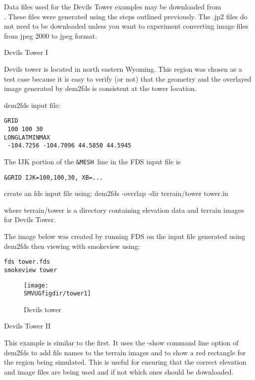 
Data files used for the Devils Tower examples may be downloaded from \\
.
These files were generated using the steps outlined previously.
The .jp2 files do not need to be downloaded unless you want to experiment converting image files from jpeg 2000 to jpeg format.

Devils Tower I

Devils tower is located in north eastern Wyoming.
This region was chosen as a test case because it is easy to verify (or not) that the geometry and the
overlayed image generated by dem2fds is consistent at the tower location.

dem2fds input file:
\begin{verbatim}
GRID
 100 100 30
LONGLATMINMAX
 -104.7256 -104.7096 44.5850 44.5945
\end{verbatim}

The IJK portion of the {\tt \&MESH}\ line in the FDS input file is

\begin{verbatim}
&GRID IJK=100,100,30, XB=...
\end{verbatim}

create an fds input file using:
dem2fds -overlap -dir terrain/tower tower.in

where terrain/tower is a directory containing elevation data and terrain images for Devils Tower.

The image below was created by running FDS on the input file generated using dem2fds then viewing with smokeview using:

\begin{verbatim}
fds tower.fds
smokeview tower
\end{verbatim}

\begin{figure}[bph]
\centerline{
\texttt{[image: \\SMVUGfigdir/tower1]}}
 \caption[FDS file overview]{Devils tower }
\label{devilstower}%
\end{figure}


Devils Tower II

This example is similar to the first. It uses the -show command line option of dem2fds to add file names
to the terrain images and to show a red rectangle for the region being simulated.
This is useful for ensuring that the correct elevation and image files are being used and if not which ones should be downloaded.

